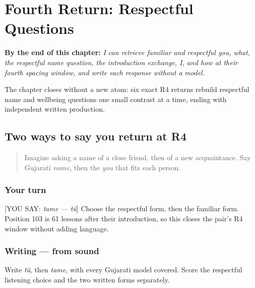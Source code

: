 
\chapter{Fourth Return: Respectful Questions}
\label{ch:gu-r4-respectful-questions}

\begin{chapteropening}
\textbf{By the end of this chapter:} \emph{I can retrieve familiar and respectful you, what, the respectful name question, the introduction exchange, I, and how at their fourth spacing window, and write each response without a model.}

The chapter closes without a new atom: six exact R4 returns rebuild respectful name and wellbeing questions one small contrast at a time, ending with independent written production.
\end{chapteropening}

\section[Practice]{Two ways to say you return at R4}

\label{lesson:GU-R17-you-r4}



\begin{quote}
Imagine asking a name of a close friend, then of a new acquaintance. Say Gujarati \emph{name}, then the \emph{you} that fits each person.
\end{quote}

\subsection*{Your turn}
{[}YOU SAY: \emph{tame — tũ}{]} Choose the respectful form, then the familiar form. Position 103 is 61 lessons after their introduction, so this closes the pair's R4 window without adding language.

\subsection*{Writing — from sound}
Write \emph{tũ}, then \emph{tame}, with every Gujarati model covered. Score the respectful listening choice and the two written forms separately.

